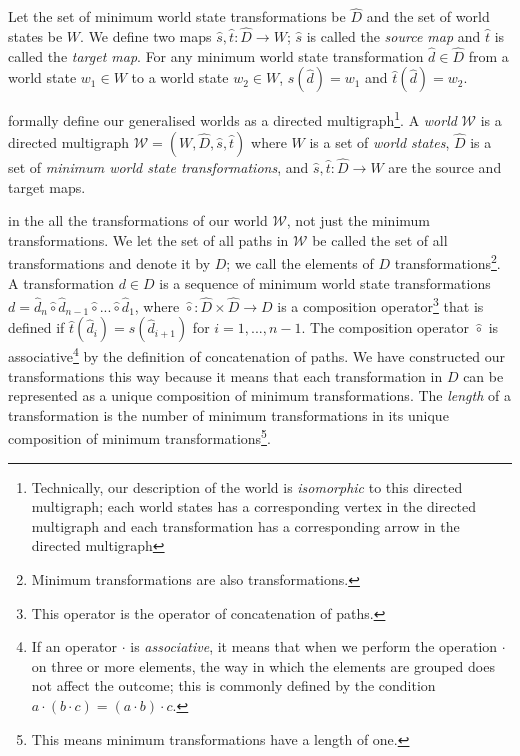 Let the set of minimum world state transformations be $\hat{D}$ and the set of world states be $W$.
We define two maps $\hat{s},\hat{t}: \hat{D} \to W$; $\hat{s}$ is called the \emph{source map} and $\hat{t}$ is called the \emph{target map}.
For any minimum world state transformation $\hat{d} \in \hat{D}$ from a world state $w_{1} \in W$ to a world state $w_{2} \in W$, $\hat{s}(\hat{d}) = w_{1}$ and $\hat{t}(\hat{d}) = w_{2}$.

 formally define our generalised worlds as a directed multigraph\footnote{Technically, our description of the world is \textit{isomorphic} to this directed multigraph; each world states has a corresponding vertex in the directed multigraph and each transformation has a corresponding arrow in the directed multigraph}.
A \emph{world} $\mathscr{W}$ is a directed multigraph $\mathscr{W} = (W, \hat{D}, \hat{s}, \hat{t})$ where $W$ is a set of \emph{world states}, $\hat{D}$ is a set of \emph{minimum world state transformations}, and $\hat{s},\hat{t}: \hat{D} \to W$ are the source and target maps.

 in the all the transformations of our world $\mathscr{W}$, not just the minimum transformations.
We let the set of all paths in $\mathscr{W}$ be called the set of all transformations and denote it by $D$; we call the elements of $D$ transformations\footnote{Minimum transformations are also transformations.}.
A transformation $d \in D$ is a sequence of minimum world state transformations $d = \hat{d}_{n} \hat{\circ} \hat{d}_{n-1} \hat{\circ} ... \hat{\circ} \hat{d}_{1}$, where $\hat{\circ}: \hat{D} \times \hat{D} \to D$ is a composition operator\footnote{This operator is the operator of concatenation of paths.} that is defined if $\hat{t}(\hat{d}_{i}) = \hat{s}(\hat{d}_{i+1})$ for $i = 1, ..., n-1$.
The composition operator $\hat{\circ}$ is associative\footnote{If an operator $\cdot$ is \emph{associative}, it means that when we perform the operation $\cdot$ on three or more elements, the way in which the elements are grouped does not affect the outcome; this is commonly defined by the condition $a \cdot (b \cdot c) = (a \cdot b) \cdot c$.} by the definition of concatenation of paths.
We have constructed our transformations this way because it means that each transformation in $D$ can be represented as a unique composition of minimum transformations. 
The \emph{length} of a transformation is the number of minimum transformations in its unique composition of minimum transformations\footnote{This means minimum transformations have a length of one.}.

